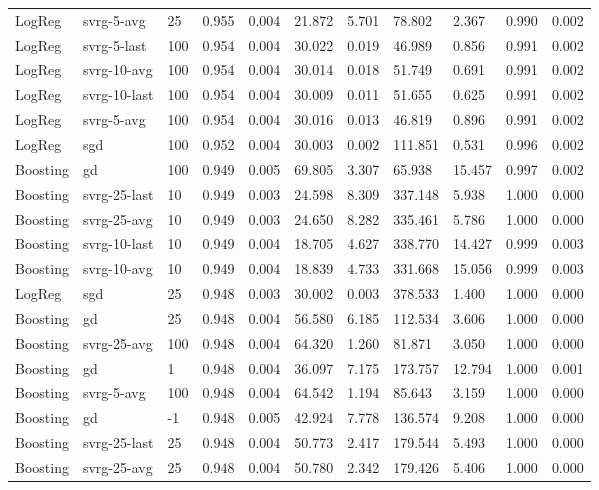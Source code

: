 \documentclass[margin={10pt 10pt 10pt 10pt}]{standalone}
\begin{document}
\begin{tabular}{lllllllllll}
    LogReg & svrg-5-avg & 25 & 0.955 & 0.004 & 21.872 & 5.701 & 78.802 & 2.367 & 0.990 & 0.002 \\
    LogReg & svrg-5-last & 100 & 0.954 & 0.004 & 30.022 & 0.019 & 46.989 & 0.856 & 0.991 & 0.002 \\
    LogReg & svrg-10-avg & 100 & 0.954 & 0.004 & 30.014 & 0.018 & 51.749 & 0.691 & 0.991 & 0.002 \\
    LogReg & svrg-10-last & 100 & 0.954 & 0.004 & 30.009 & 0.011 & 51.655 & 0.625 & 0.991 & 0.002 \\
    LogReg & svrg-5-avg & 100 & 0.954 & 0.004 & 30.016 & 0.013 & 46.819 & 0.896 & 0.991 & 0.002 \\
    LogReg & sgd & 100 & 0.952 & 0.004 & 30.003 & 0.002 & 111.851 & 0.531 & 0.996 & 0.002 \\
    Boosting & gd & 100 & 0.949 & 0.005 & 69.805 & 3.307 & 65.938 & 15.457 & 0.997 & 0.002 \\
    Boosting & svrg-25-last & 10 & 0.949 & 0.003 & 24.598 & 8.309 & 337.148 & 5.938 & 1.000 & 0.000 \\
    Boosting & svrg-25-avg & 10 & 0.949 & 0.003 & 24.650 & 8.282 & 335.461 & 5.786 & 1.000 & 0.000 \\
    Boosting & svrg-10-last & 10 & 0.949 & 0.004 & 18.705 & 4.627 & 338.770 & 14.427 & 0.999 & 0.003 \\
    Boosting & svrg-10-avg & 10 & 0.949 & 0.004 & 18.839 & 4.733 & 331.668 & 15.056 & 0.999 & 0.003 \\
    LogReg & sgd & 25 & 0.948 & 0.003 & 30.002 & 0.003 & 378.533 & 1.400 & 1.000 & 0.000 \\
    Boosting & gd & 25 & 0.948 & 0.004 & 56.580 & 6.185 & 112.534 & 3.606 & 1.000 & 0.000 \\
    Boosting & svrg-25-avg & 100 & 0.948 & 0.004 & 64.320 & 1.260 & 81.871 & 3.050 & 1.000 & 0.000 \\
    Boosting & gd & 1 & 0.948 & 0.004 & 36.097 & 7.175 & 173.757 & 12.794 & 1.000 & 0.001 \\
    Boosting & svrg-5-avg & 100 & 0.948 & 0.004 & 64.542 & 1.194 & 85.643 & 3.159 & 1.000 & 0.000 \\
    Boosting & gd & -1 & 0.948 & 0.005 & 42.924 & 7.778 & 136.574 & 9.208 & 1.000 & 0.000 \\
    Boosting & svrg-25-last & 25 & 0.948 & 0.004 & 50.773 & 2.417 & 179.544 & 5.493 & 1.000 & 0.000 \\
    Boosting & svrg-25-avg & 25 & 0.948 & 0.004 & 50.780 & 2.342 & 179.426 & 5.406 & 1.000 & 0.000 \\

\end{tabular}
\end{document}
